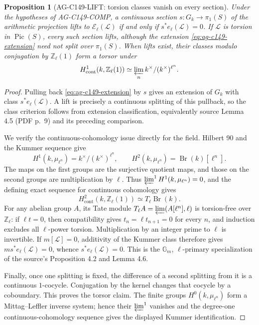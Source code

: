 \documentclass[11pt,a4paper]{article}
\newtheorem{proposition}{Proposition}
\begin{document}
\begin{proposition}[AG-C149-LIFT: torsion classes vanish on every section]
Under the hypotheses of AG-C149-COMP, a continuous section
$s:G_k\to\pi_1(S)$ of the arithmetic projection lifts to
$\mathcal E_\ell(\mathcal L)$ if and only if
$s^*e_\ell(\mathcal L)=0$. If $\mathcal L$ is torsion in
$\operatorname{Pic}(S)$, every such section lifts, although the
extension \eqref{eq:ag-c149-extension} need not split over
$\pi_1(S)$. When lifts exist, their classes modulo conjugation by
$\mathbb Z_\ell(1)$ form a torsor under
\[
 H^1_{\mathrm{cont}}(k,\mathbb Z_\ell(1))
   \simeq\varprojlim_n k^\times/(k^\times)^{\ell^n}.
\]
\end{proposition}
\begin{proof}
Pulling back \eqref{eq:ag-c149-extension} by $s$ gives an extension of
$G_k$ with class $s^*e_\ell(\mathcal L)$. A lift is precisely a
continuous splitting of this pullback, so the class criterion follows
from extension classification, equivalently source Lemma 4.5
(PDF p.~9) and its preceding comparison.

We verify the continuous-cohomology issue directly for the field.
Hilbert 90 and the Kummer sequence give
\[
 H^1(k,\mu_{\ell^n})=k^\times/(k^\times)^{\ell^n},\qquad
 H^2(k,\mu_{\ell^n})=\operatorname{Br}(k)[\ell^n].
\]
The maps on the first groups are the surjective quotient maps, and
those on the second groups are multiplication by $\ell$. Thus
$\varprojlim^1 H^1(k,\mu_{\ell^n})=0$, and the defining exact
sequence for continuous cohomology gives
\[
 H^2_{\mathrm{cont}}(k,\mathbb Z_\ell(1))
   \simeq T_\ell\operatorname{Br}(k).
\]
For any abelian group $A$, its Tate module
$T_\ell A=\varprojlim(A[\ell^n],\ell)$ is torsion-free over
$\mathbb Z_\ell$: if $\ell t=0$, then compatibility gives
$t_n=\ell t_{n+1}=0$ for every $n$, and induction excludes all
$\ell$-power torsion. Multiplication by an integer prime to $\ell$
is invertible. If $m[\mathcal L]=0$, additivity of the Kummer class
therefore gives
$m s^*e_\ell(\mathcal L)=0$, whence $s^*e_\ell(\mathcal L)=0$.
This is the $\mathbb G_m$, $\ell$-primary specialization of the
source's Proposition 4.2 and Lemma 4.6.

Finally, once one splitting is fixed, the difference of a second
splitting from it is a continuous $1$-cocycle. Conjugation by the
kernel changes that cocycle by a coboundary. This proves the torsor
claim. The finite groups $H^0(k,\mu_{\ell^n})$ form a
Mittag--Leffler inverse system; hence their $\varprojlim^1$ vanishes
and the degree-one continuous-cohomology sequence gives the displayed
Kummer identification.
\end{proof}
\end{document}
